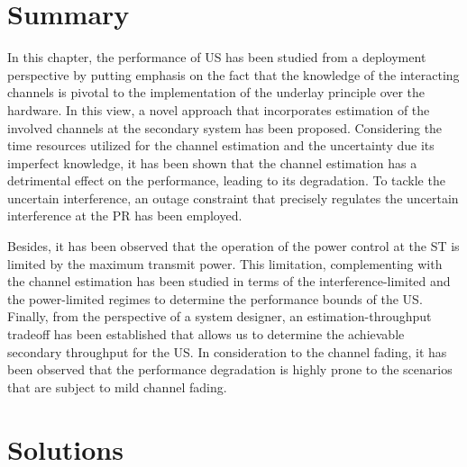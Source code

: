 \section{Summary} \label{sec_US:conc}
In this chapter, the performance of US has been studied from a deployment perspective by putting emphasis on the fact that the knowledge of the interacting channels is pivotal to the implementation of the underlay principle over the hardware. In this view, a novel approach that incorporates estimation of the involved channels at the secondary system has been proposed. Considering the time resources utilized for the channel estimation and the uncertainty due its imperfect knowledge, it has been shown that the channel estimation has a detrimental effect on the performance, leading to its degradation. To tackle the uncertain interference, an outage constraint that precisely regulates the uncertain interference at the PR has been employed. 

Besides, it has been observed that the operation of the power control at the ST is limited by the maximum transmit power. This limitation, complementing with the channel estimation has been studied in terms of the interference-limited and the power-limited regimes to determine the performance bounds of the US. %
Finally, from the perspective of a system designer, an estimation-throughput tradeoff has been established that allows us to determine the achievable secondary throughput for the US. In consideration to the channel fading, it has been observed that the performance degradation is highly prone to the scenarios that are subject to mild channel fading. 

\section{Solutions}
